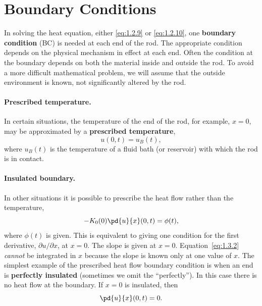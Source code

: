 
\section{Boundary Conditions}
\label{sec:1.3}

In solving the heat equation, either \eqref{eq:1.2.9} or \eqref{eq:1.2.10}, one \textbf{boundary condition} (BC) is needed at each end of the rod. The appropriate condition depends on the physical mechanism in effect at each end. Often the condition at the boundary depends on both the material inside and outside the rod. To avoid a more difficult mathematical problem, we will assume that the outside environment is known, not significantly altered by the rod.

\paragraph{Prescribed temperature.}
In certain situations, the temperature of the end of the rod, for example, $x = 0$, may be approximated by a \textbf{prescribed temperature},
\begin{equation}
u(0,t) = u_B(t),
\label{eq:1.3.1}
\end{equation}
where $u_B(t)$ is the temperature of a fluid bath (or reservoir) with which the rod is in contact.

\paragraph{Insulated boundary.}
In other situations it is possible to prescribe the heat flow rather than the temperature,
\begin{equation}
-K_0(0)\pd{u}{x}(0,t) = \phi(t),
\label{eq:1.3.2}
\end{equation}
where $\phi(t)$ is given. This is equivalent to giving one condition for the first derivative, $\partial u/\partial x$, at $x = 0$. The slope is given at $x = 0$. Equation~\eqref{eq:1.3.2} \emph{cannot} be integrated in $x$ because the slope is known only at one value of $x$. The simplest example of the prescribed heat flow boundary condition is when an end is \textbf{perfectly insulated} (sometimes we omit the ``perfectly''). In this case there is no heat flow at the boundary. If $x = 0$ is insulated, then
\begin{equation}
\pd{u}{x}(0,t) = 0.
\label{eq:1.3.3}
\end{equation}

